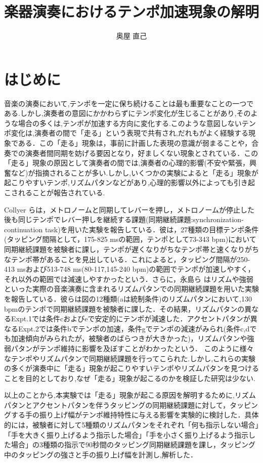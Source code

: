 \documentclass[12pt]{jarticle}
\title{楽器演奏におけるテンポ加速現象の解明}
\author{奥屋 直己}
\begin{document}
\maketitle

\section{はじめに}
音楽の演奏において,テンポを一定に保ち続けることは最も重要なことの一つである.しかし,演奏者の意図にかかわらずにテンポ変化が生じることがあり,そのような場合の多くは,テンポが加速する方向に変化する.このような意図しないテンポ変化は,演奏者の間で「走る」という表現で共有され,だれもがよく経験する現象である．この「走る」現象は，事前に計画した表現の意識が弱まることや，合奏での演奏者間同期を妨げる要因となり，好ましくない現象とされている．この「走る」現象の原因として演奏者の間では,演奏者の心理的影響(不安や緊張，興奮など)が指摘されることが多い.しかし,いくつかの実験によると「走る」現象が起こりやすいテンポ,リズムパタンなどがあり,心理的影響以外によっても引き起こされることが報告されている.

Collyer ら\cite{Collyer}は，メトロノームと同期してレバーを押し，メトロノームが停止した後も同じテンポでレバー押しを継続する課題(同期継続課題:synchronization-continuation task)を用いた実験を報告している．彼は，27種類の目標テンポ条件(タッピング間隔として，175-825 msの範囲，テンポとして73-343 bpm)において同期継続課題を被験者に課し，テンポが遅くなりがちなテンポ帯と速くなりがちなテンポ帯があることを見出している．これによると，タッピング間隔が250-413 msおよび513-748 ms(80-117,145-240 bpm)の範囲でテンポが加速しやすく，それ以外の範囲では減速しやすかったという．さらに，永島ら \cite{Nagasima}はリズムや強弱といった実際の音楽演奏に含まれるリズムパタンでの同期継続課題を用いた実験を報告している．彼らは図\label{Nagasima}の12種類(aは統制条件)のリズムパタンにおいて,130 bpmのテンポで同期継続課題を被験者に課した．その結果，リズムパタンの異なるExpt.1では条件cおよびeで安定的にテンポが減速した．アクセントパタンが異なるExpt.2では条件bでテンポの加速，条件gでテンポの減速がみられ(条件c,dでも加速傾向がみられたが，被験者のばらつきが大きかった)，リズムパタンや強弱パタンがテンポ維持に影響を及ぼすことがわかったという．
このように様々なテンポやリズムパタンで同期継続課題を行ってこられた.しかし,これらの実験の多くが演奏中に「走る」現象が起こりやすいテンポやリズムパタンを見つけることを目的としており,なぜ「走る」現象が起こるのかを検証した研究は少ない.

以上のことから,本実験では「走る」現象が起こる原因を解明するために,リズムパタンとアクセントパタンを伴うタッピングの同期継続課題に対して，タッピングする手の振り上げ幅がテンポ維持特性に与える影響を実験的に検討した．具体的には，被験者に対して5種類のリズムパタンをそれぞれ「何も指示しない場合」「手を大きく振り上げるよう指示した場合」「手を小さく振り上げるよう指示した場合」の3種類の指示で90秒間のタッピング同期継続課題を課し，タッピング中のタッピングの強さと手の振り上げ幅を計測し,解析した．
\end{document}
